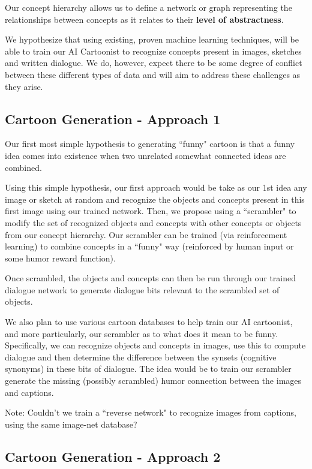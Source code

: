 \documentclass[letter]{article}
\begin{document}
Our concept hierarchy allows us to define a network or graph representing the relationships between concepts as it relates to their \textbf{level of abstractness}. 

We hypothesize that using existing, proven machine learning techniques, will be able to train our AI Cartoonist to recognize concepts present in images, sketches and written dialogue. We do, however, expect there to be some degree of conflict between these different types of data and will aim to address these challenges as they arise. 


\subsection{Cartoon Generation - Approach 1}

Our first most simple hypothesis to generating ``funny" cartoon is that a funny idea comes into existence when two unrelated somewhat connected ideas are combined. 

Using this simple hypothesis, our first approach would be take as our 1st idea any image or sketch at random and recognize the objects and concepts present in this first image using our trained network. Then, we propose using a ``scrambler" to modify the set of recognized objects and concepts with other concepts or objects from our concept hierarchy. Our scrambler can be trained (via reinforcement learning) to combine concepts in a ``funny" way (reinforced by human input or some humor reward function).

Once scrambled, the objects and concepts can then be run through our trained dialogue network to generate dialogue bits relevant to the scrambled set of objects. 

We also plan to use various cartoon databases to help train our AI cartoonist, and more particularly, our scrambler as to what does it mean to be funny. Specifically, we can recognize objects and concepts in images, use this to compute dialogue and then determine the difference between the synsets (cognitive synonyms) in these bits of dialogue. The idea would be to train our scrambler generate the missing (possibly scrambled) humor connection between the images and captions.

Note: Couldn't we train a ``reverse network" to recognize images from captions, using the same image-net database? 

\subsection{Cartoon Generation - Approach 2}
\end{document}

